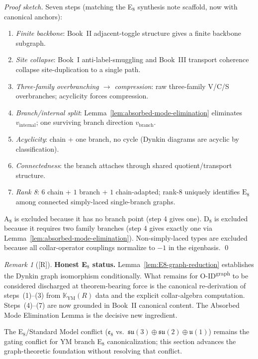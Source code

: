 \documentclass[12pt,oneside]{amsbook}
\theoremstyle{plain}
\theoremstyle{definition}
\theoremstyle{remark}
\newtheorem{remark}[theorem]{Remark}
\newcommand{\status}[1]{\textup{[#1]}}
\begin{document}
\begin{proof}[Proof sketch]
Seven steps (matching the E$_8$ synthesis note scaffold, now with
canonical anchors):
\begin{enumerate}[label=\textup{(\arabic*)}]
 \item \emph{Finite backbone}: Book~II adjacent-toggle structure
 gives a finite backbone subgraph.
 \item \emph{Site collapse}: Book~I anti-label-smuggling and Book~III
 transport coherence collapse site-duplication to a single path.
 \item \emph{Three-family overbranching $\to$ compression}: raw
 three-family V/C/S overbranches; acyclicity forces compression.
 \item \emph{Branch/internal split}: Lemma~\ref{lem:absorbed-mode-elimination}
 eliminates $v_{\mathrm{internal}}$; one surviving branch direction
 $v_{\mathrm{branch}}$.
 \item \emph{Acyclicity}: chain + one branch, no cycle (Dynkin
 diagrams are acyclic by classification).
 \item \emph{Connectedness}: the branch attaches through shared
 quotient/transport structure.
 \item \emph{Rank 8}: $6$ chain + $1$ branch + $1$ chain-adapted;
 rank-$8$ uniquely identifies $\mathrm{E}_8$ among connected
 simply-laced single-branch graphs.
\end{enumerate}
A$_8$ is excluded because it has no branch point (step 4 gives one).
D$_8$ is excluded because it requires two family branches (step 4
gives exactly one via Lemma~\ref{lem:absorbed-mode-elimination}).
Non-simply-laced types are excluded because all collar-operator
couplings normalize to $-1$ in the eigenbasis. \qed
\end{proof}

\begin{remark}[\status{R}]\label{rem:E8-status}
\textbf{Honest E$_8$ status.}
Lemma~\ref{lem:E8-graph-reduction} establishes the Dynkin graph
isomorphism conditionally. What remains for O-ID\textsuperscript{graph}
to be considered discharged at theorem-bearing force is the canonical
re-derivation of steps~(1)--(3) from $\mathbb{K}_{\mathrm{YM}}(R)$
data and the explicit collar-algebra computation. Steps~(4)--(7) are
now grounded in Book~II canonical content. The Absorbed Mode
Elimination Lemma is the decisive new ingredient.

The E$_8$/Standard Model conflict
($\mathfrak{e}_8$ vs.\ $\mathfrak{su}(3)\oplus\mathfrak{su}(2)
\oplus\mathfrak{u}(1)$) remains the gating conflict for YM branch
E$_8$ canonicalization; this section advances the graph-theoretic
foundation without resolving that conflict.
\end{remark}
\end{document}
